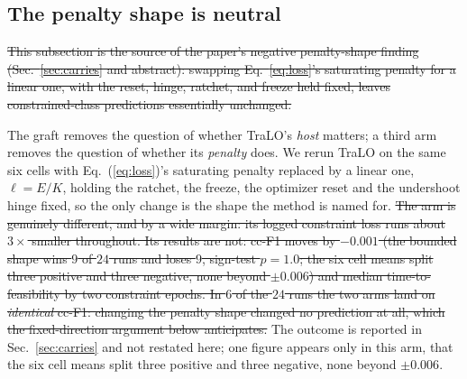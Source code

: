 \documentclass[10pt]{article}
\newcommand{\del}[1]{{\color{red}\sout{#1}}}
\begin{document}
\subsection{The penalty shape is neutral}
\label{app:shape}

\del{This subsection is the source of the paper's negative penalty-shape
finding (Sec.~\ref{sec:carries} and abstract): swapping
Eq.~\eqref{eq:loss}'s saturating penalty for a linear one, with the
reset, hinge, ratchet, and freeze held fixed, leaves constrained-class
predictions essentially unchanged.}

The graft removes the question of whether TraLO's \emph{host} matters; a
third arm removes the question of whether its \emph{penalty} does. We
rerun TraLO on the same six cells with Eq.~(\ref{eq:loss})'s saturating
penalty replaced by a linear one, $\ell = E/K$, holding the ratchet, the
freeze, the optimizer reset and the undershoot hinge fixed, so the only
change is the shape the method is named for. \del{The arm is genuinely
different, and by a wide margin: its logged constraint loss runs about
$3\times$ smaller throughout. Its results are not: cc-F1 moves by
$-0.001$ (the bounded shape wins $9$ of $24$ runs and loses $9$,
sign-test $p{=}1.0$; the six cell means split three positive and three
negative, none beyond $\pm0.006$) and median time-to-feasibility by two
constraint epochs. In $6$ of the $24$ runs the two arms land on
\emph{identical} cc-F1: changing the penalty shape changed no
prediction at all, which the fixed-direction argument below anticipates.}%
{\color{blue}The outcome is reported in Sec.~\ref{sec:carries} and not
restated here; one figure appears only in this arm, that the six cell means
split three positive and three negative, none beyond $\pm0.006$.}
\end{document}
